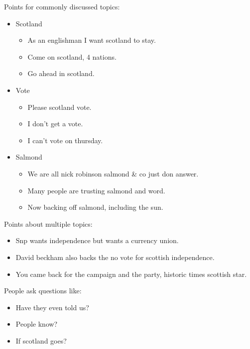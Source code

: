 \documentclass[tikz]{article}
\begin{document}
\begin{multicols}{2}
    Points for commonly discussed topics:
    \begin{itemize}[noitemsep,nolistsep,label={}]
      \item{Scotland}
        \begin{itemize}[noitemsep,nolistsep,label={}]
		\item{As an englishman I want scotland to stay.}
		\item{Come on scotland, 4 nations.}
		\item{Go ahead in scotland.}
        \end{itemize}
      \item{Vote}
        \begin{itemize}[noitemsep,nolistsep,label={}]
		\item{Please scotland vote.}
		\item{I don't get a vote.}
		\item{I can't vote on thursday.}
        \end{itemize}
      \item{Salmond}
        \begin{itemize}[noitemsep,nolistsep,label={}]
		\item{We are all nick robinson salmond \& co just don answer.}
		\item{Many people are trusting salmond and word.}
		\item{Now backing off salmond, including the sun.}
        \end{itemize}
    \end{itemize}

    Points about multiple topics:
    \begin{itemize}[noitemsep,nolistsep,label={}]
		\item{Snp wants independence but wants a currency union.}
		\item{David beckham also backs the no vote for scottish independence.}
		\item{You came back for the campaign and the party, historic times scottish star.}
    \end{itemize}

    People ask questions like:
    \begin{itemize}[noitemsep,nolistsep,label={}]
		\item{Have they even told us?}
		\item{People know?}
		\item{If scotland goes?}
    \end{itemize}


\end{multicols}
\end{document}
